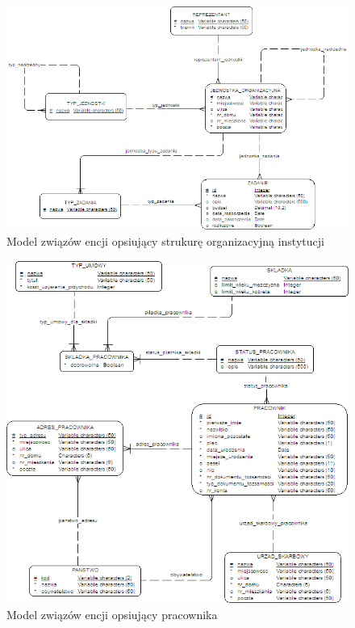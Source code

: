 \begin{figure}[tdh]
    \begin{center}
	\includegraphics[scale=.8]{img/logiczny1.png}
	\caption{Model związów encji opsiujący strukurę organizacyjną instytucji}
	\label{logiczny1}
    \end{center}
\end{figure}
\begin{figure}[tdh]
    \begin{center}
	\includegraphics[scale=.8]{img/logiczny2.png}
	\caption{Model związów encji opsiujący pracownika}
	\label{logiczny2}
    \end{center}
\end{figure}
